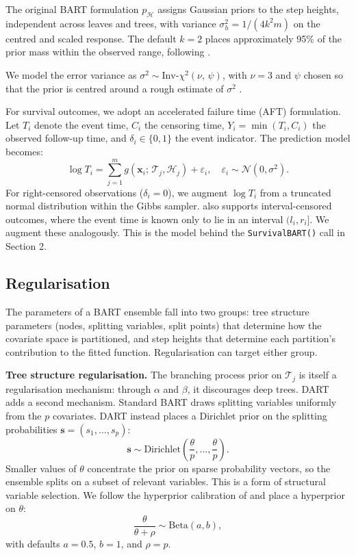 The original BART formulation \(p_{\mathcal{H}}\) assigns Gaussian priors to the step heights, independent across leaves and trees, with variance \(\sigma_h^2 = 1/(4 k^2 m)\) on the centred and scaled response. The default \(k = 2\) places approximately 95\% of the prior mass within the observed range, following \citet{chipman2010bart}.

We model the error variance as \(\sigma^2 \sim \text{Inv-}\chi^2(\nu,\, \psi)\), with \(\nu = 3\) and \(\psi\) chosen so that the prior is centred around a rough estimate of \(\sigma^2\) \citep{chipman2010bart}.

For survival outcomes, we adopt an accelerated failure time (AFT) formulation. Let \(T_i\) denote the event time, \(C_i\) the censoring time, \(Y_i = \min(T_i, C_i)\) the observed follow-up time, and \(\delta_i \in \{0, 1\}\) the event indicator. The prediction model becomes:
\[
\log T_i = \sum_{j=1}^{m} g(\mathbf{x}_i;\, \mathcal{T}_j, \mathcal{H}_j) + \varepsilon_i, \quad \varepsilon_i \sim \mathcal{N}(0, \sigma^2).
\]
For right-censored observations (\(\delta_i = 0\)), we augment \(\log T_i\) from a truncated normal distribution within the Gibbs sampler.  also supports interval-censored outcomes, where the event time is known only to lie in an interval \((l_i, r_i]\). We augment these analogously. This is the model behind the \texttt{SurvivalBART()} call in Section 2.

\subsection{Regularisation}\label{regularisation}

The parameters of a BART ensemble fall into two groups: tree structure parameters (nodes, splitting variables, split points) that determine how the covariate space is partitioned, and step heights that determine each partition's contribution to the fitted function. Regularisation can target either group.

\textbf{Tree structure regularisation.} The branching process prior on \(\mathcal{T}_j\) is itself a regularisation mechanism: through \(\alpha\) and \(\beta\), it discourages deep trees. DART \citep{linero2018dart} adds a second mechanism. Standard BART draws splitting variables uniformly from the \(p\) covariates. DART instead places a Dirichlet prior on the splitting probabilities \(\mathbf{s} = (s_1, \ldots, s_p)\):
\[
\mathbf{s} \sim \text{Dirichlet}\!\left(\frac{\theta}{p}, \ldots, \frac{\theta}{p}\right).
\]
Smaller values of \(\theta\) concentrate the prior on sparse probability vectors, so the ensemble splits on a subset of relevant variables. This is a form of structural variable selection. We follow the hyperprior calibration of \citet{linero2018dart} and place a hyperprior on \(\theta\):
\[
\frac{\theta}{\theta + \rho} \sim \text{Beta}(a, b),
\]
with defaults \(a = 0.5\), \(b = 1\), and \(\rho = p\).

